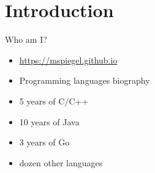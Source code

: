\section{Introduction}


\begin{frame}[c]{Who am I?}
	\begin{itemize}
		\item \url{https://mspiegel.github.io}
		\item Programming languages biography
		\item 5 years of C/C++
		\item 10 years of Java
		\item 3 years of Go
		\item \textonehalf{} dozen other languages
	\end{itemize}
\end{frame}

